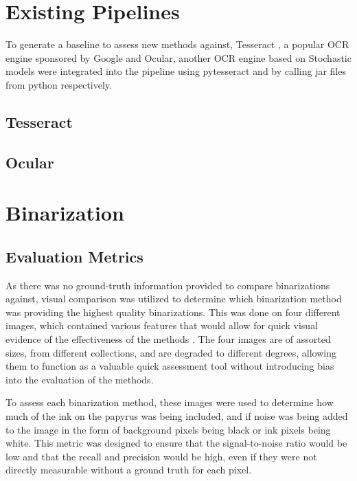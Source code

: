 \section{Existing Pipelines}

To generate a baseline to assess new methods against, Tesseract \cite{SmithTesseract}, a popular OCR engine sponsored by Google \cite{Vincent} and Ocular, another OCR engine based on Stochastic models were integrated into the pipeline using pytesseract \cite{Lee} and by calling jar files from python respectively.

\subsection{Tesseract}

\subsection{Ocular}

\section{Binarization}

\subsection{Evaluation Metrics}

As there was no ground-truth information provided to compare binarizations against, visual comparison was utilized to determine which binarization method was providing the highest quality binarizations. This was done on four different images, which contained various features that would allow for quick visual evidence of the effectiveness of the methods . The four images are of assorted sizes, from different collections, and are degraded to different degrees, allowing them to function as a valuable quick assessment tool without introducing bias into the evaluation of the methods.

To assess each binarization method, these images were used to determine how much of the ink on the papyrus was being included, and if noise was being added to the image in the form of background pixels being black or ink pixels being white. This metric was designed to ensure that the signal-to-noise ratio would be low and that the recall and precision would be high, even if they were not directly measurable without a ground truth for each pixel.

